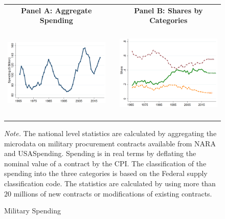 \documentclass[dv_diss_main.tex]{subfiles}
\begin{document}
\begin{figure}[H]
\begin{center}
    \begin{tabular}[c]{ccc}
    
    \normalsize{\bf Panel A: Aggregate Spending} & & \normalsize{\bf Panel B: Shares by Categories} \\
    {\includegraphics[height=1.8in,width=2.9in]{figures/graph_milspend_aggregate.png}} & & {\includegraphics[height=1.8in,width=2.9in]{figures/graph_composition_shares.png}} \\[0.1in]
    
    \end{tabular}
   \caption{Military Spending}\label{fig:share_comp}
\end{center}
    
    
    \footnotesize{\textit{Note. } The national level statistics are calculated by aggregating the microdata on military procurement contracts available from NARA and USASpending. Spending is in real terms by deflating the nominal value of a contract by the CPI. The classification of the spending into the three categories is based on the Federal supply classification code. The statistics are calculated by using more than $20$ millions of new contracts or modifications of existing contracts.}


\end{figure}
\newpage
\end{document}

